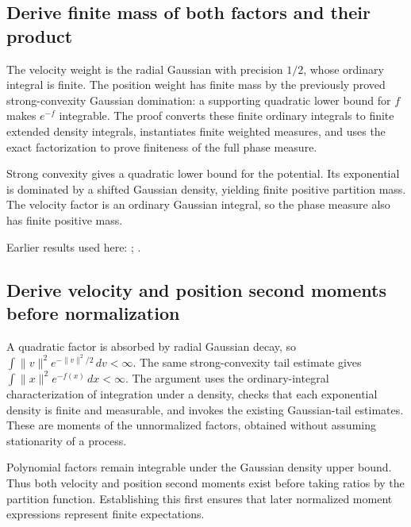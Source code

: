 \documentclass[11pt,a4paper]{report}
\begin{document}
\subsection{\texorpdfstring{Derive finite mass of both factors and their product}{Derive finite mass of both factors and their product}}
\label{report-step-KineticLangevin-HamiltonianMoments-lean-2}


The velocity weight is the radial Gaussian with precision \(1/2\), whose ordinary integral is finite. The position weight has finite mass by the previously proved strong-convexity Gaussian domination: a supporting quadratic lower bound for \(f\) makes \(e^{-f}\) integrable. The proof converts these finite ordinary integrals to finite extended density integrals, instantiates finite weighted measures, and uses the exact factorization to prove finiteness of the full phase measure.



Strong convexity gives a quadratic lower bound for the potential. Its exponential is dominated by a shifted Gaussian density, yielding finite positive partition mass. The velocity factor is an ordinary Gaussian integral, so the phase measure also has finite positive mass.



Earlier results used here: \cite[Section~3.26.10]{LangevinLean2026ULASC}; \cite[Section~3.26.4]{LangevinLean2026ULASC}.
\subsection{\texorpdfstring{Derive velocity and position second moments before normalization}{Derive velocity and position second moments before normalization}}
\label{report-step-KineticLangevin-HamiltonianMoments-lean-3}


A quadratic factor is absorbed by radial Gaussian decay, so \(\int\|v\|^2e^{-\|v\|^2/2}\,dv<\infty\). The same strong-convexity tail estimate gives \(\int\|x\|^2e^{-f(x)}\,dx<\infty\). The argument uses the ordinary-integral characterization of integration under a density, checks that each exponential density is finite and measurable, and invokes the existing Gaussian-tail estimates. These are moments of the unnormalized factors, obtained without assuming stationarity of a process.



Polynomial factors remain integrable under the Gaussian density upper bound. Thus both velocity and position second moments exist before taking ratios by the partition function. Establishing this first ensures that later normalized moment expressions represent finite expectations.
\end{document}
